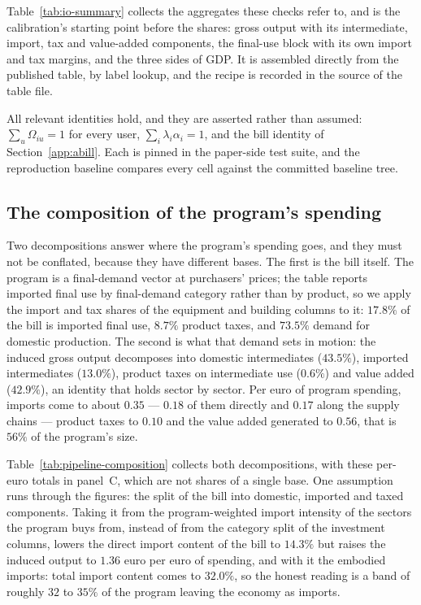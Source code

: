Table~\ref{tab:io-summary} collects the aggregates these checks refer to, and is
the calibration's starting point before the shares: gross output with its
intermediate, import, tax and value-added components, the final-use block with
its own import and tax margins, and the three sides of GDP. It is assembled
directly from the published table, by label lookup, and the recipe is recorded
in the source of the table file.



All relevant identities hold, and they are asserted rather than assumed:
$\sum_u\Omega_{iu}=1$ for every user, $\sum_i\lambda_i\alpha_i=1$, and the bill
identity of Section~\ref{app:abill}. Each is pinned in the paper-side test suite, and the reproduction baseline
compares every cell against the committed baseline tree.

\subsection{The composition of the program's spending}\label{app:pipeline-composition}

Two decompositions answer where the program's spending goes, and they must not
be conflated, because they have different bases. The first is the bill itself.
The program is a final-demand vector at purchasers' prices; the table reports
imported final use by final-demand category rather than by product, so we apply
the import and tax shares of the equipment and building columns to it:
$17.8\%$ of the bill is imported final use, $8.7\%$ product taxes, and $73.5\%$
demand for domestic production. The second is what that demand sets in motion:
the induced gross output decomposes into domestic intermediates ($43.5\%$),
imported intermediates ($13.0\%$), product taxes on intermediate use ($0.6\%$)
and value added ($42.9\%$), an identity that holds sector by sector. Per euro of
program spending, imports come to about $0.35$ --- $0.18$ of them directly and
$0.17$ along the supply chains --- product taxes to $0.10$ and the value added
generated to $0.56$, that is $56\%$ of the program's size.

Table~\ref{tab:pipeline-composition} collects both decompositions, with these
per-euro totals in panel~C, which are not shares of a single base. One assumption runs through the figures: the split of the bill into domestic, imported and taxed components. Taking it from the program-weighted import intensity of the sectors the program
buys from, instead of from the category split of the investment columns, lowers
the direct import content of the bill to $14.3\%$ but raises the induced output to
$1.36$ euro per euro of spending, and with it the embodied imports: total import
content comes to $32.0\%$, so the honest reading is a band of roughly $32$ to
$35\%$ of the program leaving the economy as imports.

